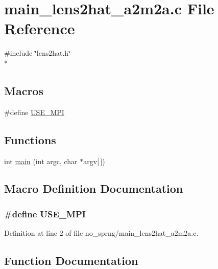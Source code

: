 \section{main\-\_\-lens2hat\-\_\-a2m2a.\-c File Reference}
\label{no__sprng_2main__lens2hat__a2m2a_8c}
{\ttfamily \#include \char`\"{}lens2hat.\-h\char`\"{}}\\*
\subsection*{Macros}
\begin{DoxyCompactItemize}
\item 
\#define \hyperlink{no__sprng_2main__lens2hat__a2m2a_8c_a3869d282031f6ea6b50fdb980b758420}{U\-S\-E\-\_\-\-M\-P\-I}
\end{DoxyCompactItemize}
\subsection*{Functions}
\begin{DoxyCompactItemize}
\item 
int \hyperlink{no__sprng_2main__lens2hat__a2m2a_8c_a0ddf1224851353fc92bfbff6f499fa97}{main} (int argc, char $\ast$argv\mbox{[}$\,$\mbox{]})
\end{DoxyCompactItemize}


\subsection{Macro Definition Documentation}
\subsubsection[{U\-S\-E\-\_\-\-M\-P\-I}]{\setlength{\rightskip}{0pt plus 5cm}\#define U\-S\-E\-\_\-\-M\-P\-I}\label{no__sprng_2main__lens2hat__a2m2a_8c_a3869d282031f6ea6b50fdb980b758420}


Definition at line 2 of file no\-\_\-sprng/main\-\_\-lens2hat\-\_\-a2m2a.\-c.



\subsection{Function Documentation}
